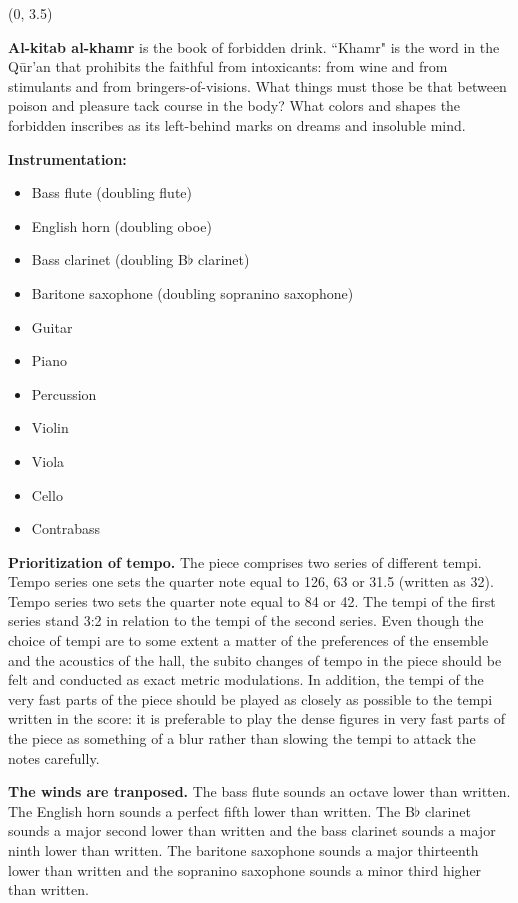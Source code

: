 \documentclass[10pt]{article}
\begin{document}
\begin{textblock}{23}(0, 3.5)

\textbf{Al-kitab al-khamr} is the book of forbidden drink. ``Khamr" is the word
in the Q\={u}r'an that prohibits the faithful from intoxicants: from wine and
from stimulants and from bringers-of-visions. What things must those be that
between poison and pleasure tack course in the body? What colors and shapes the
forbidden inscribes as its left-behind marks on dreams and insoluble mind.

\textbf{Instrumentation:}

\begin{itemize} \itemsep2pt
\item Bass flute (doubling flute)
\item English horn (doubling oboe)
\item Bass clarinet (doubling B$\flat$ clarinet)
\item Baritone saxophone (doubling sopranino saxophone)
\item Guitar
\item Piano
\item Percussion
\item Violin
\item Viola
\item Cello
\item Contrabass
\end{itemize}


\textbf{Prioritization of tempo.} The piece comprises two series of different
tempi. Tempo series one sets the quarter note equal to 126, 63 or 31.5 (written
as 32). Tempo series two sets the quarter note equal to 84 or 42. The tempi of
the first series stand 3:2 in relation to the tempi of the second series.
Even though the choice of tempi are to some extent a matter of the preferences
of the ensemble and the acoustics of the hall, the subito changes of tempo in
the piece should be felt and conducted as exact metric modulations. In
addition, the tempi of the very fast parts of the piece should be played as
closely as possible to the tempi written in the score: it is preferable to play
the dense figures in very fast parts of the piece as something of a blur rather
than slowing the tempi to attack the notes carefully.

\textbf{The winds are tranposed.} The bass flute sounds an octave lower than
written. The English horn sounds a perfect fifth lower than written. The
B$\flat$ clarinet sounds a major second lower than written and the bass
clarinet sounds a major ninth lower than written. The baritone saxophone sounds
a major thirteenth lower than written and the sopranino saxophone sounds a
minor third higher than written.


\end{textblock}
\end{document}
